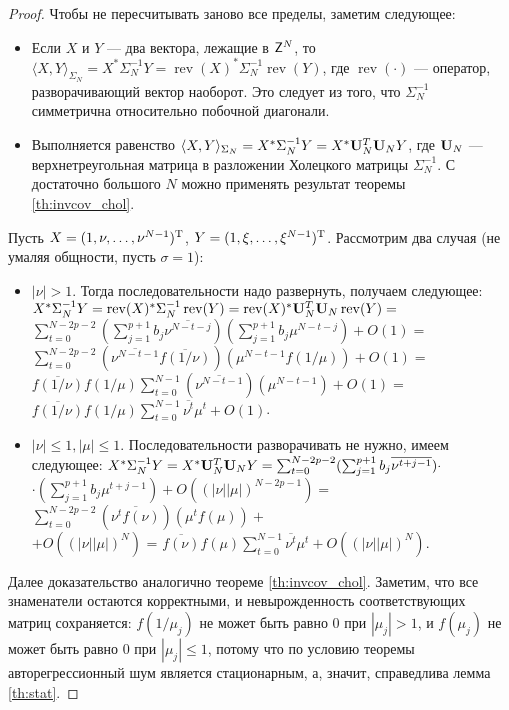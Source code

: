 \documentclass[12pt,a4paper]{article}
\def\rev{\mathop{\mathrm{rev}}}
\begin{document}
\begin{proof}
	Чтобы не пересчитывать заново все пределы, заметим следующее:
	\begin{itemize}
		\item Если $X$ и $Y$ --- два вектора, лежащие в $\mathsf{Z}^N$, то $\langle X, Y \rangle_{\Sigma_N} = X^* \Sigma_N^{-1} Y = \rev(X)^* \Sigma_N^{-1} \rev(Y)$, где $\rev(\cdot)$ --- оператор, разворачивающий вектор наоборот. Это следует из того, что $\Sigma_N^{-1}$ симметрична относительно побочной диагонали.
		\item Выполняется равенство $\langle X, Y \rangle_{\Sigma_N} = X^* \Sigma_N^{-1} Y = X^* \mathbf{U}_N^T \mathbf{U}_N Y$, где $\mathbf{U}_N$ --- верхнетреугольная матрица в разложении Холецкого матрицы $\Sigma_N^{-1}$. С достаточно большого $N$ можно применять результат теоремы \ref{th:invcov_chol}.
	\end{itemize}
	
	Пусть $X = (1, \nu, \ldots, \nu^{N-1})^{\mathrm{T}}$, $Y = (1, \xi, \ldots, \xi^{N-1})^{\mathrm{T}}$. Рассмотрим два случая (не умаляя общности, пусть $\sigma = 1$):
	\begin{itemize}
		\item $|\nu| > 1$. Тогда последовательности надо развернуть, получаем следующее:
		$X^* \Sigma_N^{-1} Y = \rev(X)^* \Sigma_N^{-1} \rev(Y) =  \rev(X)^* \bfU_N^T \bfU_N  \rev(Y) =$ \\$\sum_{t=0}^{N-{2p} -2} (\sum_{j=1}^{p+1}b_j \overline{\nu^{N - t - j}}) (\sum_{j=1}^{p+1}b_j \mu^{N - t - j}) + O(1) = $\\ $\sum_{t=0}^{N-{2p} - 2} (\overline{\nu^{N - t - 1}} \overline{f(1/\nu)})  (\mu^{N - t - 1}f(1/\mu)) + O(1) =$\\ $\overline{f(1/\nu)} f(1/\mu)\sum_{t=0}^{N-1} (\overline{\nu^{N - t - 1}} ) (\mu^{N - t - 1}) + O(1) = $\\
		$\overline{f(1/\nu)} f(1/\mu)\sum_{t=0}^{N-1} \overline{\nu^t} \mu^t + O(1)$.
		\item $|\nu| \le 1, |\mu| \le 1$. Последовательности разворачивать не нужно, имеем следующее:
		$X^* \Sigma_N^{-1} Y = X^* \mathbf{U}_N^T \mathbf{U}_N Y = \sum_{t=0}^{N-{2p}-2} (\sum_{j=1}^{p+1}b_j \overline{\nu^{
				t + j - 1}}) \cdot$ \\$\cdot (\sum_{j=1}^{p+1}b_j \mu^{t + j - 1}) + O((|\nu||\mu|)^{N - 2p - 1}) =$  
		$\sum_{t=0}^{N-{2p} -2} (\overline{\nu^t f(\nu)})(\mu^t f(\mu)) +$\\ $+ O((|\nu||\mu|)^{N})$ = 
		$\overline{f(\nu)} f(\mu) \sum_{t=0}^{N-1} \overline{\nu^t} \mu^t + O((|\nu||\mu|)^{N})$.
	\end{itemize}
	
	Далее доказательство аналогично теореме \ref{th:invcov_chol}. Заметим, что все знаменатели остаются корректными, и невырожденность соответствующих матриц сохраняется: $f(1/\mu_j)$ не может быть равно $0$ при $|\mu_j| > 1$, и $f(\mu_j)$ не может быть равно $0$ при $|\mu_j| \le 1$, потому что по условию теоремы авторегрессионный шум является стационарным, а, значит, справедлива лемма \ref{th:stat}.
\end{proof}
\end{document}
